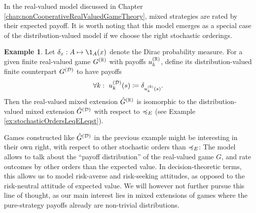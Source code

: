 \documentclass[a4paper]{scrreprt}
\theoremstyle{definition}
\newtheorem{ex}[thm]{Example} %
\begin{document}
    In the real-valued model discussed in Chapter \ref{chap:nonCooperativeRealValuedGameTheory}, mixed strategies are rated by their expected payoff. It is worth noting that this model emerges as a special case of the distribution-valued model if we choose the right stochastic orderings.
    \begin{ex}
        Let $\delta_x: A \mapsto \1_A(x)$ denote the Dirac probability measure.
        For a given finite real-valued game $G^{(\mathbb{R})}$ with payoffs $u_k^{(\mathbb{R})}$, define its distribution-valued finite counterpart $G^{(\mathcal{D})}$ to have payoffs
        \begin{gather*}
            \forall k: ~u_k^{(\mathcal{D})}(s) \coloneqq \delta_{u_k^{(\mathbb{R})}(s)}.
        \end{gather*}
        Then the real-valued mixed extension $\hat{G}^{(\mathbb{R})}$ is isomorphic to the distribution-valued mixed extension $\hat{G}^{(\mathcal{D})}$ with respect to $\preccurlyeq_E$ (see Example \ref{ex:stochasticOrdersLeqELeqst}).
    \end{ex}
    Games constructed like $\hat{G}^{(\mathcal{D})}$ in the previous example might be interesting in their own right, with respect to other stochastic orders than $\preccurlyeq_E$:
    The model allows to talk about the “payoff distribution” of the real-valued game $G$, and rate outcomes by other orders than the expected value. 
    In decision-theoretic terms, this allows us to model risk-averse and risk-seeking attitudes, as opposed to the risk-neutral attitude of expected value. We will however not further pursue this line of thought, as our main interest lies in mixed extensions of games where the pure-strategy payoffs already are non-trivial distributions.

    
\end{document}
